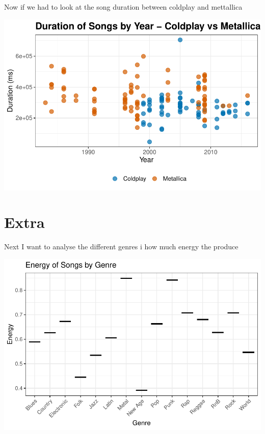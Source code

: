 \documentclass[12pt,preprint, authoryear]{elsarticle}
\let\origfigure\figure
\let\endorigfigure\endfigure
\renewenvironment{figure}[1][2] {
    \expandafter\origfigure\expandafter[H]
} {
    \endorigfigure
}
\numberwithin{equation}{section}
\numberwithin{figure}{section}
\numberwithin{table}{section}
\begin{document}
Now if we had to look at the song duration between coldplay and
mettallica

\begin{figure}[H]

{\centering \includegraphics{Q3_files/figure-latex/Figure7-1} 

}

\caption{Song Duration   \label{Figure7}}\label{fig:Figure7}
\end{figure}

\hypertarget{extra}{%
\section{Extra}\label{extra}}

Next I want to analyse the different genres i how much energy the
produce

\begin{figure}[H]

{\centering \includegraphics{Q3_files/figure-latex/Figure8-1} 

}

\caption{Engergy per Genre  \label{Figure8}}\label{fig:Figure8}
\end{figure}
\end{document}
